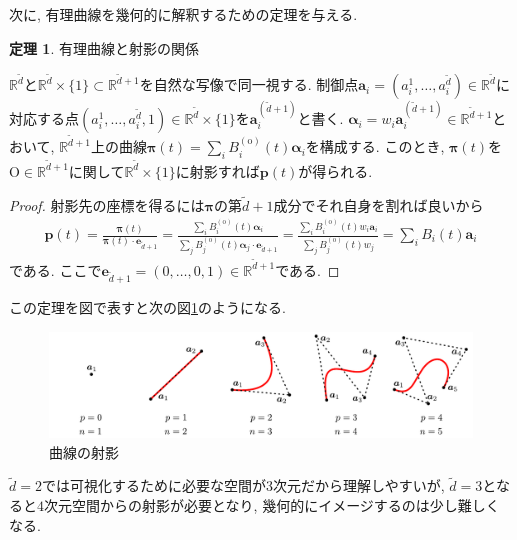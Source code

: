 \documentclass{jsarticle}
\newcommand\setR{\mathbb{R}}
\theoremstyle{definition}%
\newtheorem{thm}{定理}
\begin{document}
\newpage
次に, 有理曲線を幾何的に解釈するための定理を与える.
\begin{screen}
	\begin{thm}
		有理曲線と射影の関係

		$\mathbb{R}^{\tilde{d}}$と$\mathbb{R}^{\tilde{d}}\times\{1\}\subset\mathbb{R}^{{\tilde{d}}+1}$を自然な写像で同一視する.
		制御点$\bm{a}_i=(a_i^1,\dots,a_i^{\tilde{d}})\in\mathbb{R}^{\tilde{d}}$に対応する点$(a_i^1,\dots,a_i^{\tilde{d}},1)\in\mathbb{R}^{\tilde{d}}\times\{1\}$を$\bm{a}_i^{({\tilde{d}}+1)}$と書く.
		$\bm{\alpha}_i=w_i \bm{a}_i^{({\tilde{d}}+1)}\in\setR^{\tilde{d}+1}$とおいて, $\mathbb{R}^{{\tilde{d}}+1}$上の曲線$\bm{\pi}(t)=\sum\limits_iB_i^{(\text{o})}(t)\bm{\alpha}_i$を構成する.
		このとき, $\bm{\pi}(t)$を$\mathrm{O}\in\mathbb{R}^{{\tilde{d}}+1}$に関して$\mathbb{R}^{\tilde{d}}\times\{1\}$に射影すれば$\bm{p}(t)$が得られる.
	\end{thm}
\end{screen}
\begin{proof}
	射影先の座標を得るには$\bm{\pi}$の第${\tilde{d}}+1$成分でそれ自身を割れば良いから
	\begin{align}
		\bm{p}(t)
		=\frac{\bm{\pi}(t)}{\bm{\pi}(t)\cdot \bm{e}_{\tilde{d}+1}}
		=\frac{\sum\limits_i B_i^{(\text{o})}(t)\bm{\alpha}_i}{\sum\limits_j B_j^{(\text{o})}(t)\bm{\alpha}_j\cdot\bm{e}_{\tilde{d}+1}}
		=\frac{\sum\limits_i B_i^{(\text{o})}(t)w_i\bm{a}_i}{\sum\limits_j B_j^{(\text{o})}(t)w_j}
		=\sum_i {B}_i(t)\bm{a}_i
	\end{align}
	である.
	ここで$\bm{e}_{\tilde{d}+1}=(0,\dots,0,1)\in\mathbb{R}^{\tilde{d}+1}$である.
\end{proof}

この定理を図で表すと次の図\ref{Fig201}のようになる.
\begin{figure}[htbp]
	\centering
    \includegraphics[page=4,clip,width=120mm]{fig.pdf}
	\caption{曲線の射影}
	\label{Fig201}
\end{figure}

\noindent
$\tilde{d}=2$では可視化するために必要な空間が3次元だから理解しやすいが, $\tilde{d}=3$となると$4$次元空間からの射影が必要となり, 幾何的にイメージするのは少し難しくなる.
\end{document}
